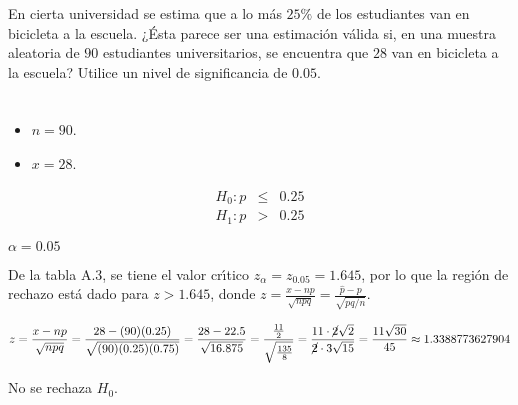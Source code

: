 \begin{enunciado}
 En cierta universidad se estima que a lo m\'as $25\%$ de los estudiantes van
 en bicicleta a la escuela.
 ¿\'Esta parece ser una estimaci\'on v\'alida
 si, en una muestra aleatoria de $90$ estudiantes universitarios, se encuentra que $28$
 van en bicicleta a la escuela?
 Utilice un nivel de significancia de $0.05$.
\end{enunciado}

\begin{solucion}
 \begin{datos}
  $\phantom{0}$
  \begin{itemize}
   \item $n=90$.
   \item $x=28$.
  \end{itemize}
 \end{datos}

 \begin{hipotesis}
  \begin{eqnarray*}
   H_0: p & \leq & 0.25 \\
   H_1: p &  >   & 0.25
  \end{eqnarray*}
 \end{hipotesis}

 \begin{significancia}
  $\alpha = 0.05$
 \end{significancia}

 \begin{region}
  De la tabla A.3, se tiene el valor cr\'{\i}tico $z_{\alpha} = z_{0.05} = 1.645$,
  por lo que la regi\'on de rechazo est\'a dado para $z > 1.645$,
  donde $z = \frac{x - np}{\sqrt{npq}} 
  = \frac{\widehat{p} - p}{\sqrt{pq/n}}$.
 \end{region}

 \begin{estadistico}
  \begin{equation*}
   z = \frac{x - np}{\sqrt{npq}}
   = \frac{28 - (90)(0.25)}{\sqrt{(90)(0.25)(0.75)}}
   = \frac{28 - 22.5}{\sqrt{16.875}}
   = \frac{\frac{11}{2}}{\sqrt{\frac{135}{8}}}
   = \frac{11\cdot \cancel{2} \sqrt{2}}{\cancel{2}\cdot3\sqrt{15}}
   = \frac{11\sqrt{30}}{45}
   \approx 1.3388773627904
  \end{equation*}
 \end{estadistico}

 \begin{decision}
  No se rechaza $H_0$.
 \end{decision}


\end{solucion}
